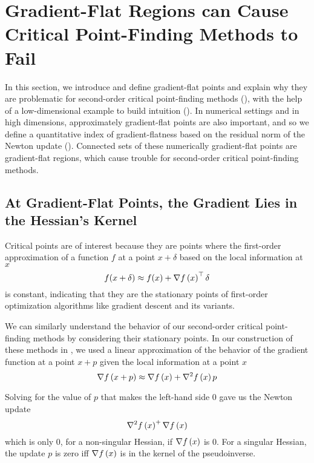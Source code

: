 \documentclass[../../thesis.tex]{subfiles}
\begin{document}
\section{Gradient-Flat Regions can Cause Critical Point-Finding Methods to Fail}%

In this section,
we introduce and define gradient-flat points and
explain why they are problematic for second-order
critical point-finding methods
(),
with the help of a low-dimensional example
to build intuition
().
In numerical settings and in high dimensions,
approximately gradient-flat points are also important,
and so we define a quantitative index of gradient-flatness
based on the residual norm of the Newton update
().
Connected sets of these numerically gradient-flat points
are gradient-flat regions,
which cause trouble for
second-order critical point-finding methods.

\subsection{At Gradient-Flat Points, the Gradient Lies in the Hessian's Kernel}%

Critical points are of interest because
they are points where the first-order approximation
of a function  $f$ at a point
$x+\delta$ based on the local information at $x$
\begin{equation}
    f(x + \delta) \approx f(x) + \nabla f\left(x\right)^\top \delta
\end{equation}
is constant, indicating that they are the stationary points
of first-order optimization algorithms
like gradient descent and its variants.

We can similarly understand the behavior of our second-order
critical point-finding methods by considering their stationary points.
In our construction of these methods in
,
we used a linear approximation of the behavior
of the gradient function
at a point $x + p$ given the local information at a point $x$
\begin{equation}
    \nabla f\left(x + p\right) \approx \nabla f\left(x\right) + \nabla^2f\left(x\right)p
\end{equation}

Solving for the value of $p$
that makes the left-hand side $0$
gave us the Newton update
\begin{equation}
	\nabla^2f\left(x\right)^{+}\nabla f\left(x\right)
\end{equation}
\noindent which is only $0$,
for a non-singular Hessian,
if $\nabla f\left(x\right)$ is $0$.
For a singular Hessian,
the update $p$ is zero iff $\nabla f\left(x\right)$ is
in the kernel of the pseudoinverse.
\end{document}
